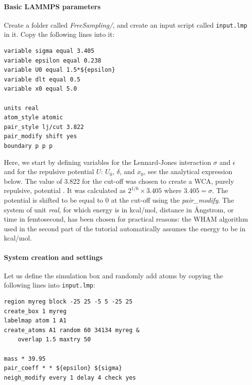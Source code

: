 \documentclass[9pt,tutorial]{livecoms}
\newcommand{\flecmd}[1]{\textcolor{command}{\texttt{#1}}} %
\begin{document}
\paragraph{Basic LAMMPS parameters}
\noindent Create a folder called \textit{FreeSampling/}, and create an input
script called \flecmd{input.lmp} in it. Copy the following lines into it:
\begin{lstlisting}
variable sigma equal 3.405
variable epsilon equal 0.238
variable U0 equal 1.5*${epsilon}
variable dlt equal 0.5
variable x0 equal 5.0

units real
atom_style atomic
pair_style lj/cut 3.822
pair_modify shift yes
boundary p p p
\end{lstlisting}
Here, we start by defining variables for the Lennard-Jones interaction
$\sigma$ and $\epsilon$ and for the repulsive potential $U$: $U_0$, $\delta$, and $x_0$,
see the analytical expression below. The value of 3.822 for the cut-off was chosen to
create a WCA, purely repulsive, potential \cite{weeks1971role}. It was calculated
as $2^{1/6} \times 3.405$ where $3.405 = \sigma$. The potential is shifted to be
equal to 0 at the cut-off using the \textit{pair\_modify}. The system of unit
\textit{real}, for which energy is in kcal/mol, distance in Ångstrom, or time in
femtosecond, has been chosen for practical reasons: the WHAM algorithm used in
the second part of the tutorial automatically assumes the energy to be in kcal/mol.

\paragraph{System creation and settings}
\noindent Let us define the simulation box and randomly add atoms by copying the
following lines into \flecmd{input.lmp}:
\begin{lstlisting}
region myreg block -25 25 -5 5 -25 25
create_box 1 myreg
labelmap atom 1 A1
create_atoms A1 random 60 34134 myreg &
    overlap 1.5 maxtry 50

mass * 39.95
pair_coeff * * ${epsilon} ${sigma}
neigh_modify every 1 delay 4 check yes
\end{lstlisting}
\end{document}
